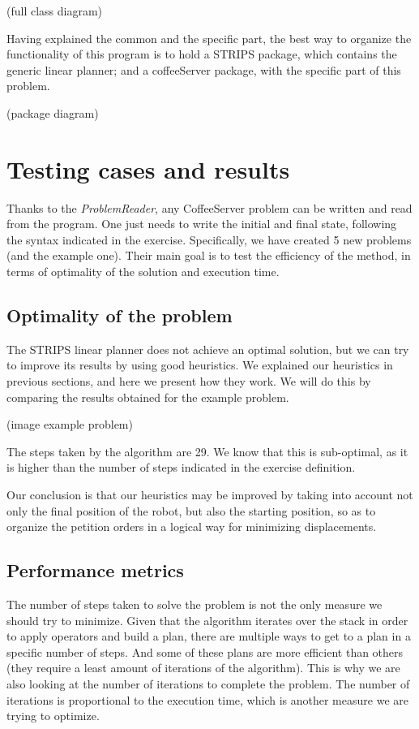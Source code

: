 \documentclass[12pt,a4paper,oneside]{article}
\numberwithin{equation}{section}
\numberwithin{equation}{section}
\theoremstyle{definition}
\begin{document}
(full class diagram)

Having explained the common and the specific part, the best way to organize the functionality of this program is to hold a STRIPS package, which contains the generic linear planner; and a coffeeServer package, with the specific part of this problem.

(package diagram)

\section{Testing cases and results}
Thanks to the \textit{ProblemReader}, any CoffeeServer problem can be written and read from the program. One just needs to write the initial and final state, following the syntax indicated in the exercise. Specifically, we have created 5 new problems (and the example one). Their main goal is to test the efficiency of the method, in terms of optimality of the solution and execution time.

\subsection{Optimality of the problem}
The STRIPS linear planner does not achieve an optimal solution, but we can try to improve its results by using good heuristics. We explained our heuristics in previous sections, and here we present how they work. We will do this by comparing the results obtained for the example problem.

(image example problem)

The steps taken by the algorithm are 29. We know that this is sub-optimal, as it is higher than the number of steps indicated in the exercise definition.

Our conclusion is that our heuristics may be improved by taking into account not only the final position of the robot, but also the starting position, so as to organize the petition orders in a logical way for minimizing displacements.

\subsection{Performance metrics}
The number of steps taken to solve the problem is not the only measure we should try to minimize. Given that the algorithm iterates over the stack in order to apply operators and build a plan, there are multiple ways to get to a plan in a specific number of steps. And some of these plans are more efficient than others (they require a least amount of iterations of the algorithm). This is why we are also looking at the number of iterations to complete the problem. The number of iterations is proportional to the execution time, which is another measure we are trying to optimize. 
\end{document}

